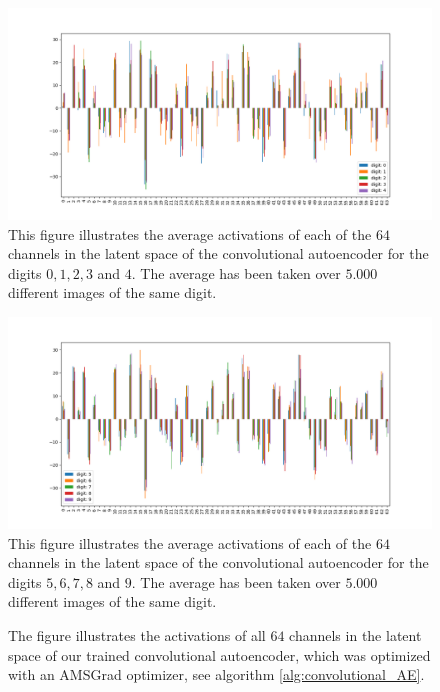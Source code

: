 \begin{figure}
\begin{center}
   \begin{minipage}[b]{\linewidth}
      \includegraphics[width=\linewidth]{convolutional_AE_latent_0}
      This figure illustrates the average activations of each of the $64$ channels in the latent space of the convolutional autoencoder for the digits $0, 1, 2, 3$ and  $4$. The average has been taken over $5.000$ different images of the same digit.
	\end{minipage}
   \begin{minipage}[b]{\linewidth}
      \includegraphics[width=\linewidth]{convolutional_AE_latent_1}
      This figure illustrates the average activations of each of the $64$ channels in the latent space of the convolutional autoencoder for the digits $5, 6, 7, 8$ and $9$. The average has been taken over $5.000$ different images of the same digit.
	\end{minipage}
\end{center}
\caption{The figure illustrates the activations of all $64$ channels in the latent space of our trained convolutional autoencoder, which was optimized with an AMSGrad optimizer, see algorithm \ref{alg:convolutional_AE}.}\label{fig:convolutional_AE_latent}
\end{figure}

